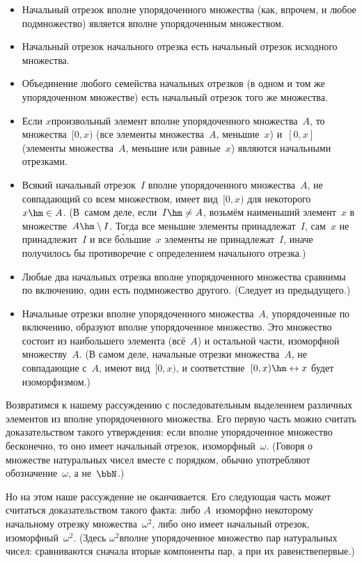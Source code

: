 \begin{itemize}
\item
Начальный отрезок вполне упорядоченного множества
(как, впрочем, и любое подмножество) является
вполне упорядоченным множеством.
\item
Начальный отрезок начального отрезка есть начальный отрезок
исходного множества.
\item
Объединение любого семейства начальных отрезков (в одном и том
же упорядоченном множестве) есть начальный отрезок того же
множества.
\item
Если $x$\т произвольный элемент вполне упорядоченного
множества~$A$, то множества~$[0,x)$ (все элементы множества~$A$,
меньшие~$x$) и~$[0,x]$ (элементы множества~$A$, меньшие или
равные~$x$) являются начальными отрезками.
\item\label{initial-segment-structure}%
Всякий начальный отрезок~$I$ вполне упорядоченного
множества~$A$, не совпадающий со всем множеством, имеет вид~$[0,x)$
для некоторого~$x\hm\in A$. (В~самом деле, если~$I\hm\ne
A$, возьмём наименьший элемент~$x$ в множестве~$A\hm\setminus I$.
Тогда все меньшие элементы принадлежат~$I$, сам~$x$ не
принадлежит~$I$ и все б\'ольшие~$x$ элементы не принадлежат~$I$,
иначе получилось бы противоречие с определением начального
отрезка.)
\item
Любые два начальных отрезка вполне упорядоченного множества
сравнимы по включению, 
один есть подмножество другого.
(Следует из пре\-ды\-ду\-щего.)
\item
Начальные отрезки вполне упорядоченного множества~$A$,
упорядоченные по включению, образуют вполне упорядоченное
множество. Это множество состоит из наибольшего элемента
(всё~$A$) и остальной части, изоморфной множеству~$A$. (В самом
деле, начальные отрезки множества~$A$, не совпадающие с~$A$,
имеют вид~$[0,x)$, и соответствие~$[0,x)\hm\leftrightarrow x$ будет
изоморфизмом.)
\end{itemize}

Возвратимся к нашему рассуждению с последовательным выделением
различных элементов из вполне упорядоченного множества. Его
первую часть можно считать доказательством такого утверждения:
если вполне упорядоченное множество бесконечно, то оно имеет
начальный отрезок, изоморфный~$\omega$. (Говоря о множестве
натуральных чисел вместе с порядком, обычно употребляют
обозначение~$\omega$\index{$\omega$}, а не~$\bbN$.)

Но на этом наше рассуждение не оканчивается. Его следующая часть
может считаться доказательством такого факта: либо $A$~изоморфно
некоторому начальному отрезку множества~$\omega^2$, либо оно
имеет начальный отрезок, изоморфный~$\omega^2$. (Здесь
$\omega^2$\т вполне упорядоченное множество пар натуральных
чисел: сравниваются сначала вторые компоненты пар, а при их
равенстве\т первые.)

